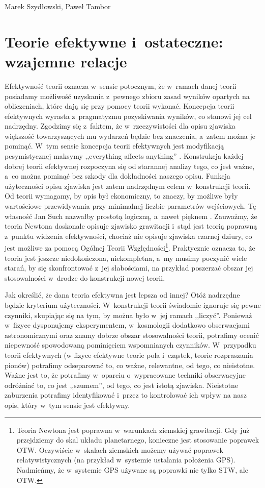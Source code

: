 \begin{artplenv2auth}{Marek Szydłowski, Paweł Tambor}
\section{Teorie efektywne i~ostateczne: wzajemne relacje}
Efektywność teorii oznacza w~sensie potocznym, że w~ramach danej teorii posiadamy możliwość uzyskania z~pewnego zbioru zasad wyników opartych na obliczeniach, które dają się przy pomocy teorii wykonać. Koncepcja teorii efektywnych wyrasta z~pragmatyzmu pozyskiwania wyników, co stanowi jej cel nadrzędny. Zgodzimy się z~faktem, że w~rzeczywistości dla opisu zjawiska większość towarzyszących mu wydarzeń będzie bez znaczenia, a~zatem można je pominąć. W~tym sensie koncepcja teorii efektywnych jest modyfikacją pesymistycznej maksymy ,,everything affects anything''
\parencite[][s.~1]{wells_effective_2012}. %
 Konstrukcja każdej dobrej teorii efektywnej rozpoczyna się od starannej analizy tego, co jest ważne, a~co można pominąć bez szkody dla dokładności naszego opisu. Funkcja użyteczności opisu zjawiska jest zatem nadrzędnym celem w~konstrukcji teorii. Od teorii wymagamy, by opis był ekonomiczny, to znaczy, by możliwe były wartościowe przewidywania przy minimalnej liczbie parametrów wejściowych. Tę własność Jan Such nazwałby prostotą logiczną, a~nawet pięknem 
\parencites[por.][s.~45]{such_czy_1975}[zob. także][s.~45]{such_na_2014}. %
 Zauważmy, że teoria Newtona doskonale opisuje zjawisko grawitacji i~stąd jest teorią poprawną z~punktu widzenia efektywności, chociaż nie opisuje zjawiska czarnej dziury, co jest możliwe za pomocą Ogólnej Teorii Względności\footnote{Teoria Newtona jest poprawna w~warunkach ziemskiej grawitacji. Gdy już przejdziemy do skal układu planetarnego, konieczne jest stosowanie poprawek OTW. Oczywiście w~skalach ziemskich możemy używać poprawek relatywistycznych (na przykład w~systemie ustalania położenia GPS). Nadmieńmy, że w~systemie GPS używane są poprawki nie tylko STW, ale OTW.}. Praktycznie oznacza to, że teoria jest jeszcze niedokończona, niekompletna, a~my musimy poczynić wiele starań, by się skonfrontować z~jej słabościami, na przykład poszerzać obszar jej stosowalności w~drodze do konstrukcji nowej teorii.

Jak określić, że dana teoria efektywna jest lepsza od innej? Otóż nadrzędne będzie kryterium użyteczności. W~konstrukcji teorii świadomie ignoruje się pewne czynniki, skupiając się na tym, by można było w~jej ramach ,,liczyć''. Ponieważ w~fizyce dysponujemy eksperymentem, w~kosmologii dodatkowo obserwacjami astronomicznymi oraz znamy dobrze obszar stosowalności teorii, potrafimy ocenić niepewność spowodowaną pominięciem wspomnianych czynników. W~przypadku teorii efektywnych (w fizyce efektywne teorie pola i~cząstek, teorie rozpraszania pionów) potrafimy odseparować to, co ważne, relewantne, od tego, co nieistotne. Ważne jest to, że potrafimy w~oparciu o~wypracowane techniki obserwacyjne odróżniać to, co jest ,,szumem'', od tego, co jest istotą zjawiska. Nieistotne zaburzenia potrafimy identyfikować i~przez to kontrolować ich wpływ na nasz opis, który w~tym sensie jest efektywny.


\end{artplenv2auth}
